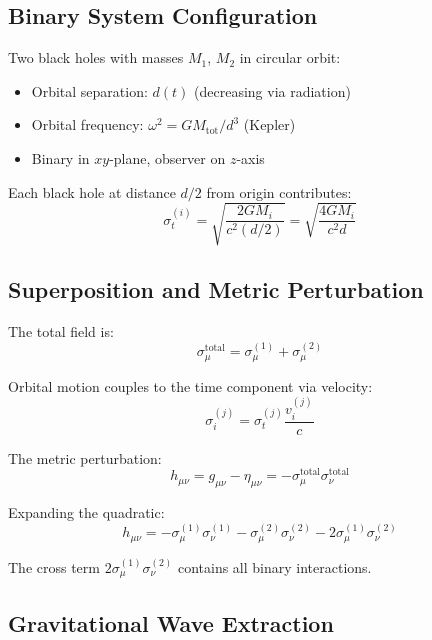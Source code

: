 \documentclass[11pt,a4paper]{article}
\theoremstyle{definition}
\theoremstyle{remark}
\begin{document}
	\subsection{Binary System Configuration}
	
	Two black holes with masses $M_1$, $M_2$ in circular orbit:
	\begin{itemize}
		\item Orbital separation: $d(t)$ (decreasing via radiation)
		\item Orbital frequency: $\omega^2 = GM_{\text{tot}}/d^3$ (Kepler)
		\item Binary in $xy$-plane, observer on $z$-axis
	\end{itemize}
	
	Each black hole at distance $d/2$ from origin contributes:
	\begin{equation}
		\sigma_t^{(i)} = \sqrt{\frac{2GM_i}{c^2(d/2)}} = \sqrt{\frac{4GM_i}{c^2d}}
	\end{equation}
	
	\subsection{Superposition and Metric Perturbation}
	
	The total field is:
	\begin{equation}
		\sigma_\mu^{\text{total}} = \sigma_\mu^{(1)} + \sigma_\mu^{(2)}
		\label{eq:binary_superposition}
	\end{equation}
	
	Orbital motion couples to the time component via velocity:
	\begin{equation}
		\sigma_i^{(j)} = \sigma_t^{(j)} \frac{v_i^{(j)}}{c}
	\end{equation}
	
	The metric perturbation:
	\begin{equation}
		h_{\mu\nu} = g_{\mu\nu} - \eta_{\mu\nu} = -\sigma_\mu^{\text{total}}\sigma_\nu^{\text{total}}
	\end{equation}
	
	Expanding the quadratic:
	\begin{equation}
		h_{\mu\nu} = -\sigma_\mu^{(1)}\sigma_\nu^{(1)} - \sigma_\mu^{(2)}\sigma_\nu^{(2)} - 2\sigma_\mu^{(1)}\sigma_\nu^{(2)}
	\end{equation}
	
	The cross term $2\sigma_\mu^{(1)}\sigma_\nu^{(2)}$ contains all binary interactions.
	
	\subsection{Gravitational Wave Extraction}
	
\end{document}
